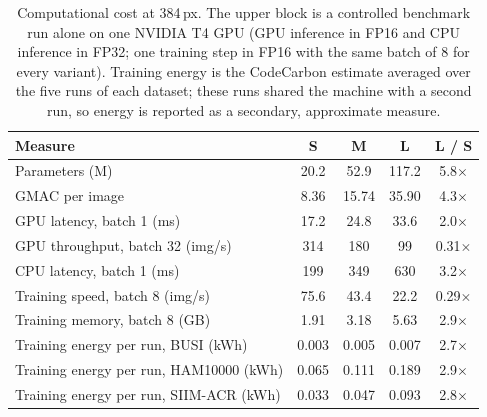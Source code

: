 \begin{table}[!htbp]
\centering
\caption{Computational cost at 384\,px. The upper block is a controlled benchmark run alone on one NVIDIA T4 GPU (GPU inference in FP16 and CPU inference in FP32; one training step in FP16 with the same batch of 8 for every variant). Training energy is the CodeCarbon estimate averaged over the five runs of each dataset; these runs shared the machine with a second run, so energy is reported as a secondary, approximate measure.}
\label{tab:cost}
\small
\begin{tabular}{lcccc}
\toprule
Measure & S & M & L & L / S \\
\midrule
Parameters (M) & 20.2 & 52.9 & 117.2 & 5.8$\times$ \\
GMAC per image & 8.36 & 15.74 & 35.90 & 4.3$\times$ \\
GPU latency, batch 1 (ms) & 17.2 & 24.8 & 33.6 & 2.0$\times$ \\
GPU throughput, batch 32 (img/s) & 314 & 180 & 99 & 0.31$\times$ \\
CPU latency, batch 1 (ms) & 199 & 349 & 630 & 3.2$\times$ \\
Training speed, batch 8 (img/s) & 75.6 & 43.4 & 22.2 & 0.29$\times$ \\
Training memory, batch 8 (GB) & 1.91 & 3.18 & 5.63 & 2.9$\times$ \\
\midrule
Training energy per run, BUSI (kWh) & 0.003 & 0.005 & 0.007 & 2.7$\times$ \\
Training energy per run, HAM10000 (kWh) & 0.065 & 0.111 & 0.189 & 2.9$\times$ \\
Training energy per run, SIIM-ACR (kWh) & 0.033 & 0.047 & 0.093 & 2.8$\times$ \\
\bottomrule
\end{tabular}
\end{table}
